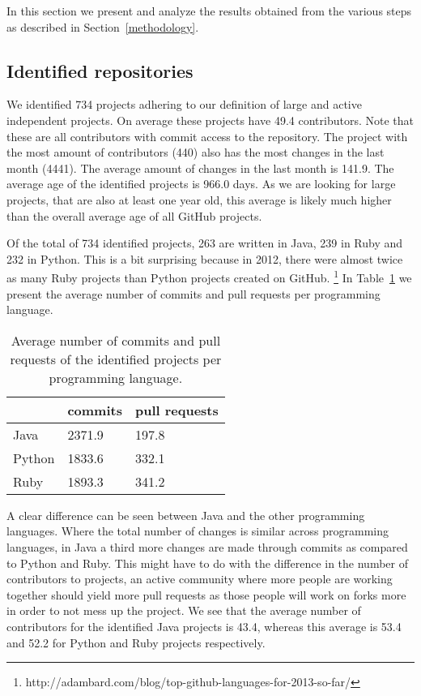 In this section we present and analyze the results obtained from the various steps as described in Section~\ref{methodology}.

\subsection{Identified repositories}
We identified 734 projects adhering to our definition of large and active independent projects.
On average these projects have 49.4 contributors. 
Note that these are all contributors with commit access to the repository.
The project with the most amount of contributors (440) also has the most changes in the last month (4441).
The average amount of changes in the last month is 141.9.
The average age of the identified projects is 966.0 days. 
As we are looking for large projects, that are also at least one year old, this average is likely much higher than the overall average age of all GitHub projects.

Of the total of 734 identified projects, 263 are written in Java, 239 in Ruby and 232 in Python. 
This is a bit surprising because in 2012, there were almost twice as many Ruby projects than Python projects created on GitHub. \footnote{http://adambard.com/blog/top-github-languages-for-2013-so-far/}
In Table~\ref{tab:allChanges} we present the average number of commits and pull requests per programming language.
\begin{table}[h]
\begin{tabular}{ l | l l }
 & commits & pull requests\\
\hline
Java & 2371.9 & 197.8 \\
Python & 1833.6 & 332.1 \\
Ruby & 1893.3 & 341.2
\end{tabular}
\caption{Average number of commits and pull requests of the identified projects per programming language.}
\label{tab:allChanges}
\end{table}
A clear difference can be seen between Java and the other programming languages. 
Where the total number of changes is similar across programming languages, in Java a third more changes are made through commits as compared to Python and Ruby.
This might have to do with the difference in the number of contributors to projects, an active community where more people are working together should yield more pull requests as those people will work on forks more in order to not mess up the project. 
We see that the average number of contributors for the identified Java projects is 43.4, whereas this average is 53.4 and 52.2 for Python and Ruby projects respectively.

